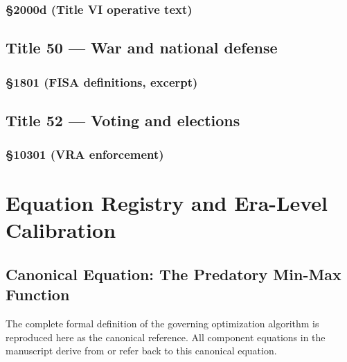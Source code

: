 \subsection*{§2000d (Title VI operative text)}
\label{apx:usc:42:2000d}


\section*{Title 50 --- War and national defense}

\subsection*{§1801 (FISA definitions, excerpt)}
\label{apx:usc:50:1801abc}


\section*{Title 52 --- Voting and elections}

\subsection*{§10301 (VRA enforcement)}
\label{apx:usc:52:10301}


\chapter{Equation Registry and Era-Level Calibration}
\label{sec:equation_registry}

\section{Canonical Equation: The Predatory Min-Max Function}

The complete formal definition of the governing optimization algorithm is reproduced here as the canonical reference. All component equations in the manuscript derive from or refer back to this canonical equation.

